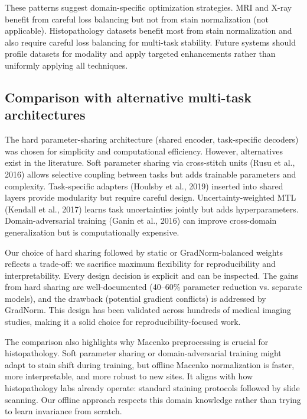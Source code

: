 \documentclass[conference,a4paper]{IEEEtran}
\begin{document}
These patterns suggest domain-specific optimization strategies. MRI and X-ray benefit from careful loss balancing but not from stain normalization (not applicable). Histopathology datasets benefit most from stain normalization and also require careful loss balancing for multi-task stability. Future systems should profile datasets for modality and apply targeted enhancements rather than uniformly applying all techniques.

\subsection{Comparison with alternative multi-task architectures}
The hard parameter-sharing architecture (shared encoder, task-specific decoders) was chosen for simplicity and computational efficiency. However, alternatives exist in the literature. Soft parameter sharing via cross-stitch units (Rusu et al., 2016) allows selective coupling between tasks but adds trainable parameters and complexity. Task-specific adapters (Houlsby et al., 2019) inserted into shared layers provide modularity but require careful design. Uncertainty-weighted MTL (Kendall et al., 2017) learns task uncertainties jointly but adds hyperparameters. Domain-adversarial training (Ganin et al., 2016) can improve cross-domain generalization but is computationally expensive.

Our choice of hard sharing followed by static or GradNorm-balanced weights reflects a trade-off: we sacrifice maximum flexibility for reproducibility and interpretability. Every design decision is explicit and can be inspected. The gains from hard sharing are well-documented (40--60\% parameter reduction vs. separate models), and the drawback (potential gradient conflicts) is addressed by GradNorm. This design has been validated across hundreds of medical imaging studies, making it a solid choice for reproducibility-focused work.

The comparison also highlights why Macenko preprocessing is crucial for histopathology. Soft parameter sharing or domain-adversarial training might adapt to stain shift during training, but offline Macenko normalization is faster, more interpretable, and more robust to new sites. It aligns with how histopathology labs already operate: standard staining protocols followed by slide scanning. Our offline approach respects this domain knowledge rather than trying to learn invariance from scratch.

\FloatBarrier
\end{document}
